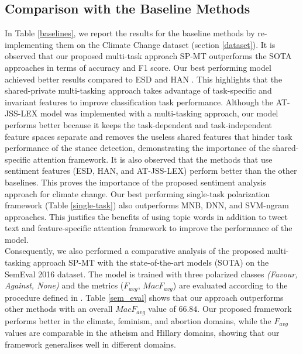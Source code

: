 \documentclass[letterpaper]{article} %
\begin{document}
\subsection{Comparison with the Baseline Methods}
In Table \ref{baselines}, we report the results for the baseline methods by re-implementing them on the Climate Change dataset (section \ref{dataset}). It is observed that our proposed multi-task approach SP-MT outperforms the SOTA approaches in terms of accuracy and F1 score. Our best performing model achieved better results compared to ESD \cite{vychegzhanin2021new} and HAN \cite{wang2020neural}. This highlights that the shared-private multi-tasking approach takes advantage of task-specific and invariant features to improve classification task performance. Although the AT-JSS-LEX \cite{li2019multi} model was implemented with a multi-tasking approach, our model performs better because it keeps the task-dependent and task-independent feature spaces separate and removes the useless shared features that hinder task performance of the stance detection, demonstrating the importance of the shared-specific attention framework. It is also observed that the methods that use sentiment features (ESD, HAN, and AT-JSS-LEX) perform better than the other baselines. This proves the importance of the proposed sentiment analysis approach for climate change. Our best performing single-task polarization framework (Table \ref{single-task}) also outperforms MNB, DNN, and SVM-ngram approaches. This justifies the benefits of using topic words in addition to tweet text and feature-specific attention framework to improve the performance of the model. \\
\noindent Consequently, we also performed a comparative analysis of the proposed multi-tasking approach SP-MT with the state-of-the-art models (SOTA) on the SemEval 2016 dataset. The model is trained with three polarized classes \textit{(Favour, Against, None)} and the metrics ($F_{avg}$, $MacF_{avg}$) are evaluated according to the procedure defined in \cite{li2019multi}. Table \ref{sem_eval} shows that our approach outperforms other methods with an overall $MacF_{avg}$ value of $66.84$. Our proposed framework performs better in the climate, feminism, and abortion domains, while the $F_{avg}$ values are comparable in the atheism and Hillary domains, showing that our framework generalises well in different domains.
\end{document}
